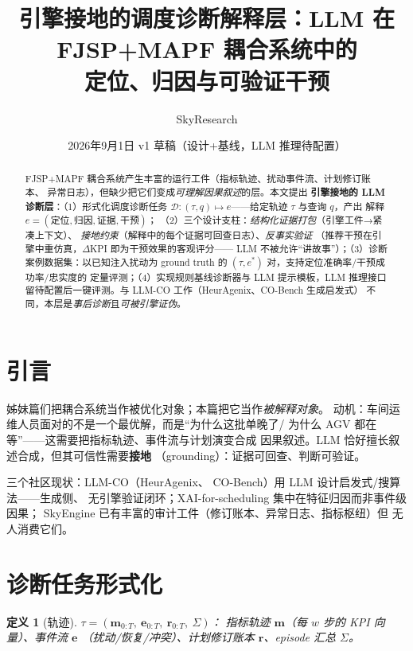 \documentclass[UTF8,12pt,a4paper]{ctexart}
\title{引擎接地的调度诊断解释层：LLM 在 FJSP+MAPF 耦合系统中的\\定位、归因与可验证干预}
\author{SkyResearch}
\date{2026年9月1日 \quad v1 草稿（设计+基线，LLM 推理待配置）}
\newtheorem{definition}{定义}
\begin{document}
\maketitle

\begin{abstract}
FJSP+MAPF 耦合系统产生丰富的运行工件（指标轨迹、扰动事件流、计划修订账本、
异常日志），但缺少把它们变成\emph{可理解因果叙述}的层。本文提出
\textbf{引擎接地的 LLM 诊断层}：（1）形式化调度诊断任务
$\mathcal{D}:(\tau,q)\mapsto e$——给定轨迹 $\tau$ 与查询 $q$，产出
解释 $e=(\text{定位},\text{归因},\text{证据},\text{干预})$；
（2）三个设计支柱：\emph{结构化证据打包}（引擎工件→紧凑上下文）、
\emph{接地约束}（解释中的每个证据可回查日志）、\emph{反事实验证}
（推荐干预在引擎中重仿真，$\Delta$KPI 即为干预效果的客观评分——
LLM 不被允许``讲故事''）；（3）诊断案例数据集：以已知注入扰动为
ground truth 的 $(\tau, e^*)$ 对，支持定位准确率/干预成功率/忠实度的
定量评测；（4）实现规则基线诊断器与 LLM 提示模板，LLM 推理接口
留待配置后一键评测。与 LLM-CO 工作（HeurAgenix、CO-Bench 生成启发式）
不同，本层是\emph{事后诊断}且\emph{可被引擎证伪}。
\end{abstract}

\section{引言}

姊妹篇们把耦合系统当作被优化对象；本篇把它当作\emph{被解释对象}。
动机：车间运维人员面对的不是一个最优解，而是``为什么这批单晚了/
为什么 AGV 都在等''——这需要把指标轨迹、事件流与计划演变合成
因果叙述。LLM 恰好擅长叙述合成，但其可信性需要\textbf{接地}
（grounding）：证据可回查、判断可验证。

三个社区现状：LLM-CO（HeurAgenix\cite{heuragenix2025}、
CO-Bench\cite{cobench2026}）用 LLM 设计启发式/搜算法——生成侧、
无引擎验证闭环；XAI-for-scheduling 集中在特征归因而非事件级因果；
SkyEngine 已有丰富的审计工件（修订账本、异常日志、指标枢纽）但
无人消费它们。

\section{诊断任务形式化}\label{sec:form}

\begin{definition}[轨迹]
$\tau = (\mathbf{m}_{0:T},\ \mathbf{e}_{0:T},\ \mathbf{r}_{0:T},\ \Sigma)$：
指标轨迹 $\mathbf{m}$（每 $w$ 步的 KPI 向量）、事件流 $\mathbf{e}$
（扰动/恢复/冲突）、计划修订账本 $\mathbf{r}$、episode 汇总 $\Sigma$。
\end{definition}
\end{document}
